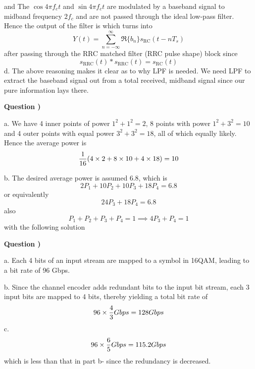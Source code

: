 \documentclass[10pt,letterpaper]{article}
\newcounter{QuestionNumber}
\newcommand{\Q}{
\textbf{Question \theQuestionNumber)}
\stepcounter{QuestionNumber}
}
\newcommand{\nl}{\newline\newline}
\begin{document}
and
The $\cos 4\pi f_ct$ and $\sin 4\pi f_ct$ are modulated by a baseband signal to midband frequency $2f_c$ and are not passed through the ideal low-pass filter. Hence the output of the filter is
which turns into 
$$
Y(t)=\sum_{n=-\infty}^{\infty} \Re\{b_n\}s_\text{RC}(t-nT_s)
$$
after passing through the RRC matched filter (RRC pulse shape) block since
$$
s_\text{RRC}(t)*s_\text{RRC}(t)=s_\text{RC}(t)
$$
d. The above reasoning makes it clear as to why LPF is needed. We need LPF to extract the baseband signal out from a total received, midband signal since our pure information lays there.
\nl
\Q

a. We have 4 inner points of power $1^2+1^2=2$, 8 points with power $1^2+3^2=10$ and 4 outer points with equal power $3^2+3^2=18$, all of which equally likely. Hence the average power is 
$$
{1\over 16}(4\times 2+8\times 10+4\times 18)=10
$$

b. The desired average power is assumed 6.8, which is
$$
2P_1+10P_2+10P_3+18P_4=6.8
$$
or equivalently
$$
24P_3+18P_4=6.8
$$
also
$$
P_1+P_2+P_3+P_4=1\implies 4P_3+P_4=1
$$
with the following solution
\Q

a. Each 4 bits of an input stream are mapped to a symbol in 16QAM, leading to a bit rate of 96 Gbps.

b. Since the channel encoder adds redundant bits to the input bit stream, each 3 input bits are mapped to 4 bits, thereby yielding a total bit rate of
$$
96\times {4\over 3} Gbps=128 Gbps
$$
c.
$$
96\times {6\over 5} Gbps=115.2 Gbps
$$
which is less than that in part b- since the redundancy is decreased.
\end{document}
